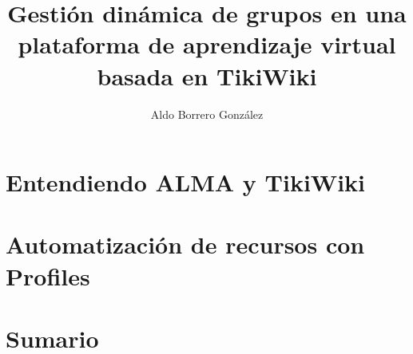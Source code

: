 \documentclass[12pt,
			 oneside,
             ]{UAHMemoir}
\author{Aldo Borrero González}
\title{Gestión dinámica de grupos en una plataforma de aprendizaje virtual basada en TikiWiki}
\begin{document}
  \frontmatter
    \maketitle
    \clearpage
    
    \clearpage
    \tableofcontents
    \clearpage
    \listoffigures
    \clearpage
    
    

  \mainmatter
    
    
    \part{Entendiendo ALMA y TikiWiki}
      
      
      
      
    \part{Automatización de recursos con Profiles}
      
      
    
    \part{Sumario}
      

    \appendixpage*

     \begin{appendices}
       
       
       
     \end{appendices}

  \backmatter
    \printglossary[title=Acrónimos, toctitle=Acrónimos]
    \printbibliography
\end{document}
